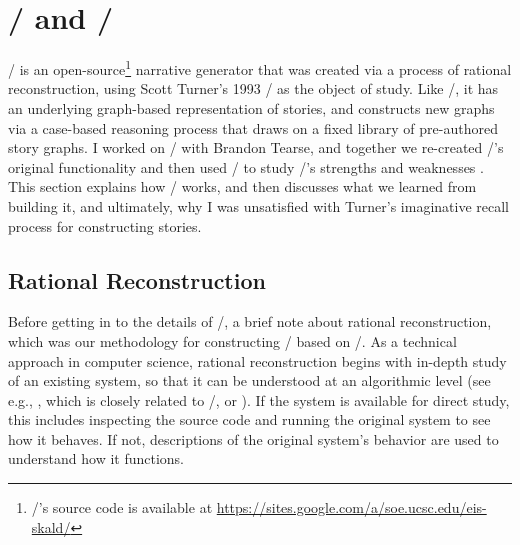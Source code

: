 \chapter{\minstrel/ and \skald/}

\label{ch:skald}

\skald/ is an open-source\footnote{\skald/'s source code is available at \url{https://sites.google.com/a/soe.ucsc.edu/eis-skald/}} narrative generator that was created via a process of rational reconstruction, using Scott Turner's 1993 \minstrel/ as the object of study.
%
Like \minstrel/, it has an underlying graph-based representation of stories, and constructs new graphs via a case-based reasoning process that draws on a fixed library of pre-authored story graphs.
%
I worked on \skald/ with Brandon Tearse, and together we re-created \minstrel/'s original functionality and then used \skald/ to study \minstrel/'s strengths and weaknesses \citep{Tearse2011, Tearse2012, Tearse2014}.
%
This section explains how \skald/ works, and then discusses what we learned from building it, and ultimately, why I was unsatisfied with Turner's imaginative recall process for constructing stories.



\section{Rational Reconstruction}


Before getting in to the details of \skald/, a brief note about rational reconstruction, which was our methodology for constructing \skald/ based on \minstrel/.
%
As a technical approach in computer science, rational reconstruction begins with in-depth study of an existing system, so that it can be understood at an algorithmic level (see e.g., \citep{Peinado2006}, which is closely related to \skald/, or \citep{Musen1995}).
%
If the system is available for direct study, this includes inspecting the source code and running the original system to see how it behaves.
%
If not, descriptions of the original system's behavior are used to understand how it functions.


